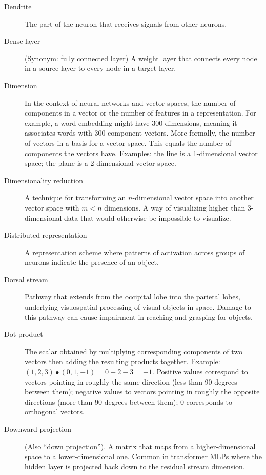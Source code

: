\begin{description}
\item[Dendrite] The part of the neuron that receives signals from other neurons.


\item[Dense layer] (Synonym: fully connected layer) A weight layer that connects every node in a source layer to every node in a target layer.

\item[Dimension] In the context of neural networks and vector spaces, the number of components in a vector or the number of features in a representation. For example, a word embedding might have 300 dimensions, meaning it associates words with 300-component vectors. More formally, the number of vectors in a basis for a vector space. This equals the number of components the vectors have. Examples: the line is a 1-dimensional vector space; the plane is a 2-dimensional vector space.

\item[Dimensionality reduction] A technique for transforming an $n$-dimensional vector space into another vector space with $m<n$ dimensions. A way of visualizing higher than 3-dimensional data that would otherwise be impossible to visualize.

\item[Distributed representation] A representation scheme where patterns of activation across groups of neurons indicate the presence of an object.

\item[Dorsal stream] Pathway that extends from the occipital lobe into the parietal lobes, underlying visuospatial processing of visual objects in space. Damage to this pathway can cause impairment in reaching and grasping for objects.

\item[Dot product] The scalar obtained by multiplying corresponding components of two vectors then adding the resulting products together. Example: $(1,2,3) \bullet (0,1,-1) = 0+2-3 = -1$.  Positive values correspond to vectors pointing in roughly the same direction (less than 90 degrees between them); negative values to vectors pointing in roughly the opposite directions (more than 90 degrees between them); 0 corresponds to orthogonal vectors.

\item[Downward projection] (Also ``down projection''). A matrix that maps from a higher-dimensional space to a lower-dimensional one. Common in transformer MLPs where the hidden layer is projected back down to the residual stream dimension.


\end{description}
